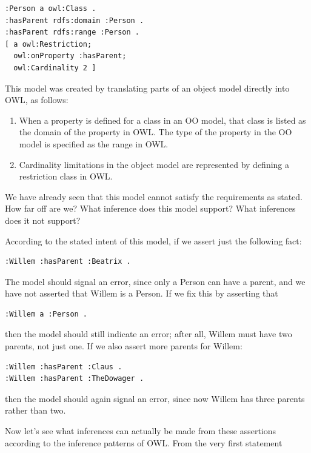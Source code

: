 \begin{lstlisting}
:Person a owl:Class .
:hasParent rdfs:domain :Person .
:hasParent rdfs:range :Person .
[ a owl:Restriction;
  owl:onProperty :hasParent;
  owl:Cardinality 2 ]
\end{lstlisting}

This model was created by translating parts of an object model directly
into OWL, as follows:

\begin{enumerate}
\item When a property is defined for a class in an OO model, that class is
listed as the domain of the property in OWL. The type of the property in
the OO model is specified as the range in OWL.

\item Cardinality limitations in the object model are represented by
defining a restriction class in OWL.
\end{enumerate}

We have already seen that this model cannot satisfy the requirements as
stated. How far off are we? What inference does this model support? What
inferences does it not support?

According to the stated intent of this model, if we assert just the
following fact:

\begin{lstlisting}
:Willem :hasParent :Beatrix .
\end{lstlisting}

The model should signal an error, since only a Person can have a parent,
and we have not asserted that Willem is a Person. If we fix this by
asserting that

\begin{lstlisting}
:Willem a :Person .
\end{lstlisting}

then the model should still indicate an error; after all, Willem must
have two parents, not just one. If we also assert more parents for
Willem:

\begin{lstlisting}
:Willem :hasParent :Claus .
:Willem :hasParent :TheDowager .
\end{lstlisting}

then the model should again signal an error, since now Willem has three
parents rather than two.

Now let's see what inferences can actually be made from these assertions
according to the inference patterns of OWL. From the very first
statement

